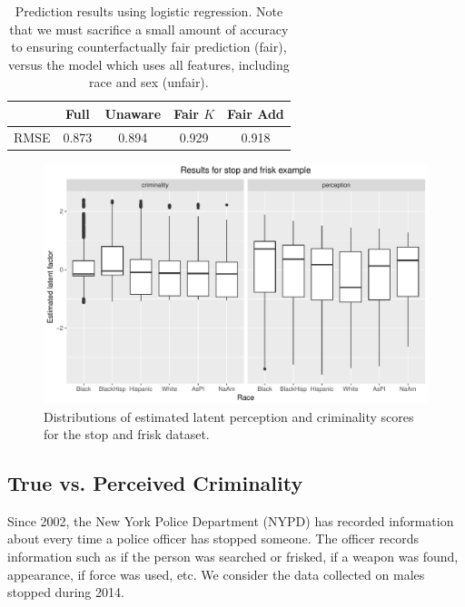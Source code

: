 \begin{table}
\centering
\caption{Prediction results using logistic regression. Note that we must sacrifice a small amount of accuracy to ensuring counterfactually fair prediction (fair), versus the model which uses all features, including race and sex (unfair).}\label{table.pred_law}
\begin{tabular}{ccccc} 
\hline
 &  {\bf Full} & {\bf Unaware} & {\bf Fair $K$} & {\bf Fair Add} \\
\hline
RMSE & 0.873 & 0.894 & 0.929 & 0.918 \\
\hline
\end{tabular}
\end{table}

\begin{figure}[!th]
\begin{center}
\vspace{-1ex}
\centerline{\includegraphics[width=\columnwidth]{stopandfrisk_output.pdf}}
\vspace{-2ex}
\caption{Distributions of estimated latent perception and criminality scores for the stop and frisk dataset.\label{figure.stop_and_frisk_output}\vspace{-5ex}}
\vspace{-2ex}
\end{center}
\end{figure}


\subsection{True vs. Perceived Criminality}
\label{sec:true-vs.-perceived}
Since 2002, the New York Police Department (NYPD) has recorded
information about every time a police officer has stopped someone. The
officer records information such as if the person was searched or
frisked, if a weapon was found, appearance, if force was used, etc. We
consider the data collected on males stopped during 2014. %

